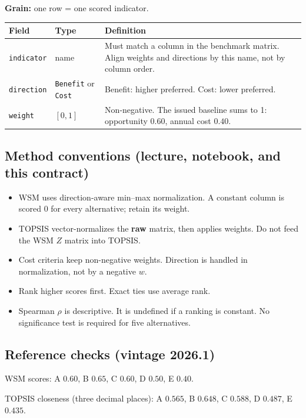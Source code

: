 \documentclass[11pt,a4paper]{article}
\begin{document}
\textbf{Grain:} one row = one scored indicator.

\begin{center}
\small
\begin{tabularx}{\textwidth}{@{}p{}p{}X@{}}
\toprule
Field & Type & Definition \\
\midrule
\texttt{indicator} & name & Must match a column in the benchmark
matrix. Align weights and directions by this name, not by column
order. \\
\texttt{direction} & \texttt{Benefit} or \texttt{Cost} &
Benefit: higher preferred. Cost: lower preferred. \\
\texttt{weight} & $[0,1]$ & Non-negative. The issued baseline sums
to 1: opportunity $0.60$, annual cost $0.40$. \\
\bottomrule
\end{tabularx}
\end{center}

\subsection*{Method conventions (lecture, notebook, and this contract)}

\begin{itemize}
    \item WSM uses direction-aware min--max normalization. A constant
    column is scored 0 for every alternative; retain its weight.
    \item TOPSIS vector-normalizes the \textbf{raw} matrix, then applies
    weights. Do not feed the WSM $Z$ matrix into TOPSIS.
    \item Cost criteria keep non-negative weights. Direction is handled
    in normalization, not by a negative $w$.
    \item Rank higher scores first. Exact ties use average rank.
    \item Spearman $\rho$ is descriptive. It is undefined if a ranking
    is constant. No significance test is required for five alternatives.
\end{itemize}

\subsection*{Reference checks (vintage 2026.1)}

WSM scores: A $0.60$, B $0.65$, C $0.60$, D $0.50$, E $0.40$.

TOPSIS closeness (three decimal places): A $0.565$, B $0.648$,
C $0.588$, D $0.487$, E $0.435$.
\end{document}
